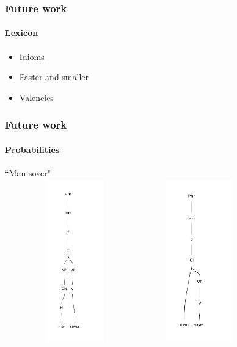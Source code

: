\documentclass[10pt]{beamer}
\renewcommand{\baselinestretch}{1.5}
\begin{document}
\begin{frame}
 \renewcommand{\baselinestretch}{1.0}
\frametitle{Future work}
\framesubtitle{Lexicon} 
\begin{itemize}
\item Idioms
\item Faster and smaller
\item Valencies
\end{itemize}
\end{frame}

\begin{frame}
\renewcommand{\baselinestretch}{1.0}
\frametitle{Future work}
\framesubtitle{Probabilities} 
\center
``Man sover"\\
\includegraphics[width=170pt,height=200pt]{man1.pdf}
\includegraphics[width=130pt,height=200pt]{man.pdf}
\end{frame}
\end{document}
